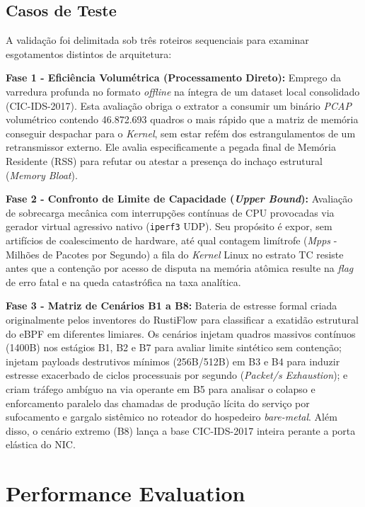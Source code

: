 \documentclass[conference]{IEEEtran}
\begin{document}
\subsection{Casos de Teste}

A validação foi delimitada sob três roteiros sequenciais para examinar esgotamentos distintos de arquitetura:

\textbf{Fase 1 - Eficiência Volumétrica (Processamento Direto):} Emprego da varredura profunda no formato \textit{offline} na íntegra de um dataset local consolidado (CIC-IDS-2017). Esta avaliação obriga o extrator a consumir um binário \textit{PCAP} volumétrico contendo 46.872.693 quadros o mais rápido que a matriz de memória conseguir despachar para o \textit{Kernel}, sem estar refém dos estrangulamentos de um retransmissor externo. Ele avalia especificamente a pegada final de Memória Residente (RSS) para refutar ou atestar a presença do inchaço estrutural (\textit{Memory Bloat}).

\textbf{Fase 2 - Confronto de Limite de Capacidade (\textit{Upper Bound}):} Avaliação de sobrecarga mecânica com interrupções contínuas de CPU provocadas via gerador virtual agressivo nativo (\texttt{iperf3} UDP). Seu propósito é expor, sem artifícios de coalescimento de hardware, até qual contagem limítrofe (\textit{Mpps} - Milhões de Pacotes por Segundo) a fila do \textit{Kernel} Linux no estrato TC resiste antes que a contenção por acesso de disputa na memória atômica resulte na \textit{flag} de erro fatal e na queda catastrófica na taxa analítica.

\textbf{Fase 3 - Matriz de Cenários B1 a B8:} Bateria de estresse formal criada originalmente pelos inventores do RustiFlow para classificar a exatidão estrutural do eBPF em diferentes limiares. Os cenários injetam quadros massivos contínuos (1400B) nos estágios B1, B2 e B7 para avaliar limite sintético sem contenção; injetam payloads destrutivos mínimos (256B/512B) em B3 e B4 para induzir estresse exacerbado de ciclos processuais por segundo (\textit{Packet/s Exhaustion}); e criam tráfego ambíguo na via operante em B5 para analisar o colapso e enforcamento paralelo das chamadas de produção lícita do serviço por sufocamento e gargalo sistêmico no roteador do hospedeiro \textit{bare-metal}. Além disso, o cenário extremo (B8) lança a base CIC-IDS-2017 inteira perante a porta elástica do NIC.

\section{Performance Evaluation}
\end{document}

